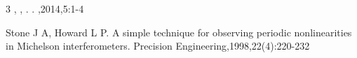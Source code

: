 \documentclass{article}
\begin{document}

{}


\label{bibtexref}


\begin{thebibliography}{3}
	\label{latexref}
	\seccontent
	  , , . . ,2014,5:1-4

	 Stone J A, Howard L P. A simple technique for observing periodic nonlinearities in Michelson interferometers. Precision Engineering,1998,22(4):220-232

\end{thebibliography}



{}
\section*{ }
\end{document}
